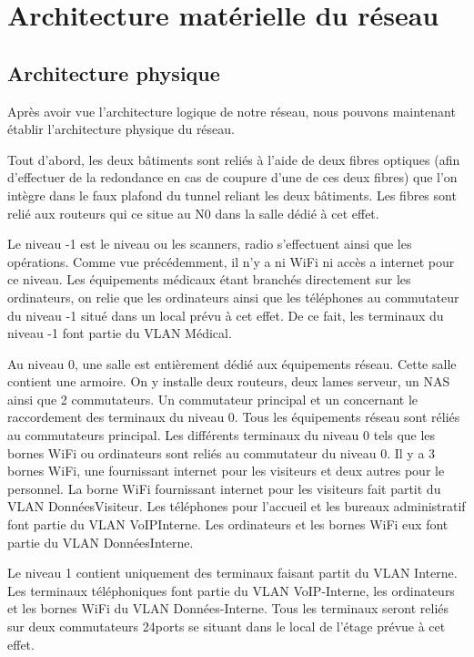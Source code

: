 \section{Architecture matérielle du réseau}

%
%
\subsection{Architecture physique}

Après avoir vue l'architecture logique de notre réseau, nous pouvons maintenant établir l'architecture physique du réseau.

Tout d’abord, les deux bâtiments sont reliés à l’aide de deux fibres optiques (afin d’effectuer de la redondance en cas de coupure d’une de ces deux fibres) que l’on intègre dans le faux plafond du tunnel reliant les deux bâtiments.
Les fibres sont relié aux routeurs qui ce situe au N0 dans la salle dédié à cet effet.

Le niveau -1 est le niveau ou les scanners, radio s'effectuent ainsi que les opérations.
Comme vue précédemment, il n'y a ni WiFi ni accès a internet pour ce niveau.
Les équipements médicaux étant branchés directement sur les ordinateurs, on relie que les ordinateurs ainsi que les téléphones au commutateur du niveau -1 situé dans un local prévu à cet effet.
De ce fait, les terminaux du niveau -1 font partie du VLAN Médical.

Au niveau 0, une salle est entièrement dédié aux équipements réseau.
Cette salle contient une armoire. On y installe deux routeurs, deux lames serveur, un NAS ainsi que 2 commutateurs.
Un commutateur principal et un concernant le raccordement des terminaux du niveau 0.
Tous les équipements réseau sont réliés au commutateurs principal.
Les différents terminaux du niveau 0 tels que les bornes WiFi ou ordinateurs sont reliés au commutateur du niveau 0.
Il y a 3 bornes WiFi, une fournissant internet pour les visiteurs et deux autres pour le personnel.
La borne WiFi fournissant internet pour les visiteurs fait partit du VLAN DonnéesVisiteur.
Les téléphones pour l’accueil et les bureaux administratif font partie du VLAN VoIPInterne.
Les ordinateurs et les bornes WiFi eux font partie du VLAN DonnéesInterne.

Le niveau 1 contient  uniquement des terminaux faisant partit du VLAN Interne.
Les terminaux téléphoniques font partie du VLAN VoIP-Interne, les ordinateurs et les bornes WiFi du VLAN Données-Interne.
Tous les terminaux seront reliés sur deux commutateurs 24ports se situant dans le local de l'étage prévue à cet effet.

